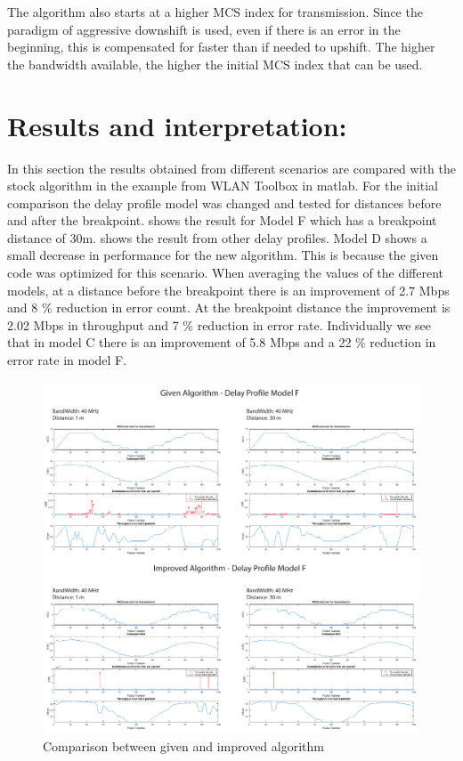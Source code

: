 \documentclass[a4paper]{article}
\begin{document}
The algorithm also starts at a higher MCS index for transmission. Since the paradigm of aggressive downshift is used, even if there is an error in the beginning, this is compensated for faster than if needed to upshift. The higher the bandwidth available, the higher the initial MCS index that can be used.


\section{Results and interpretation:}
In this section the results obtained from different scenarios are compared with the stock algorithm in the example from WLAN Toolbox in matlab. For the initial comparison the delay profile model was changed and tested for distances before and after the breakpoint.  shows the result for Model F which has a breakpoint distance of 30m.  shows the result from other delay profiles. Model D shows a small decrease in performance for the new algorithm. This is because the given code was optimized for this scenario. When averaging the values of the different models, at a distance before the breakpoint there is an improvement of 2.7 Mbps and 8 \% reduction in error count. At the breakpoint distance the improvement is 2.02 Mbps in throughput and 7 \% reduction in error rate. Individually we see that in model C there is an improvement of 5.8 Mbps and a 22 \% reduction in error rate in model F.

\begin{figure}[h]
\centering
\includegraphics[width=1\textwidth]{DelayProfile.pdf}
\caption{Comparison between given and improved algorithm}
\label{fig:delayProfile}
\end{figure}
\end{document}
